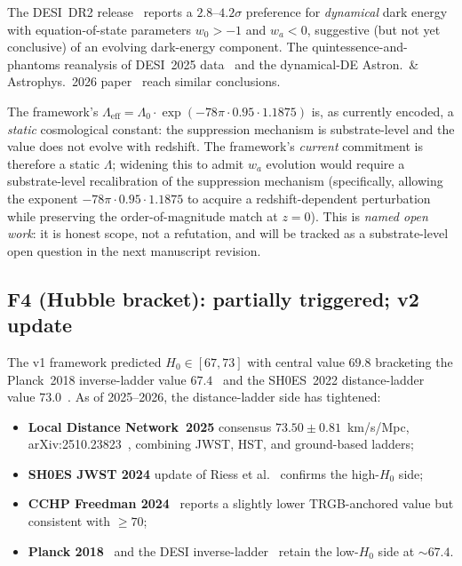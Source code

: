 \documentclass[11pt,a4paper]{article}
\theoremstyle{definition}
\theoremstyle{remark}
\newcommand{\Lambdaeff}{\Lambda_{\mathrm{eff}}}
\begin{document}
The DESI~DR2 release~\cite{desidr2} reports a $2.8$--$4.2\sigma$
preference for \emph{dynamical} dark energy with equation-of-state
parameters $w_{0} > -1$ and $w_{a} < 0$, suggestive (but not
yet conclusive) of an evolving dark-energy component. The
quintessence-and-phantoms reanalysis of DESI~2025
data~\cite{quintdesi2025} and the dynamical-DE Astron.\ \&
Astrophys.\ 2026 paper~\cite{dynde2026} reach similar
conclusions.

The framework's $\Lambdaeff = \Lambda_{0} \cdot \exp(-78\pi \cdot
0.95 \cdot 1.1875)$ is, as currently encoded, a \emph{static}
cosmological constant: the suppression mechanism is substrate-level
and the value does not evolve with redshift. The framework's
\emph{current} commitment is therefore a static $\Lambda$;
widening this to admit $w_{a}$ evolution would require a
substrate-level recalibration of the suppression mechanism
(specifically, allowing the exponent $-78\pi \cdot 0.95 \cdot
1.1875$ to acquire a redshift-dependent perturbation while
preserving the order-of-magnitude match at $z = 0$). This is
\emph{named open work}: it is honest scope, not a refutation, and
will be tracked as a substrate-level open question in the next
manuscript revision.

\subsection{F4 (Hubble bracket): partially triggered; v2 update}
\label{sec:f4-update}

The v1 framework predicted $H_{0} \in [67, 73]$ with central
value $69.8$ bracketing the Planck~2018 inverse-ladder value
$67.4$~\cite{planck2018} and the SH0ES~2022 distance-ladder
value $73.0$~\cite{shoes2022}. As of 2025--2026, the
distance-ladder side has tightened:
\begin{itemize}[leftmargin=*,nosep]
\item \textbf{Local Distance Network~2025} consensus
$73.50 \pm 0.81$~km/s/Mpc, arXiv:2510.23823~\cite{ldn2025},
combining JWST, HST, and ground-based ladders;
\item \textbf{SH0ES JWST 2024} update of
Riess et al.~\cite{shoesjwst2024} confirms the high-$H_{0}$ side;
\item \textbf{CCHP Freedman 2024}~\cite{cchp2024} reports a
slightly lower TRGB-anchored value but consistent with
$\geq 70$;
\item \textbf{Planck 2018}~\cite{planck2018} and the
DESI inverse-ladder~\cite{desi2024} retain the low-$H_{0}$
side at ${\sim}67.4$.
\end{itemize}
\end{document}
